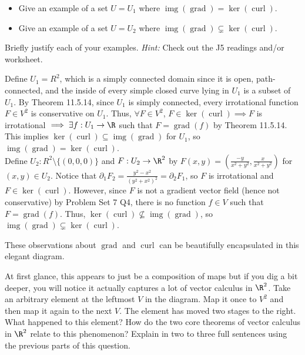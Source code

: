 \documentclass{exam}
\DeclareMathOperator{\Img}{img} %
\DeclareMathOperator{\Ker}{ker} %
\DeclareMathOperator{\Grad}{grad} %
\DeclareMathOperator{\Curl}{curl} %
\begin{document}
\begin{questions}
\begin{parts}
	\begin{itemize}
		\item Give an example of a set $U = U_1$ where $\Img(\Grad)  = \Ker(\Curl)$.
		\item Give an example of a set $U = U_2$ where $\Img(\Grad) \subsetneq \Ker(\Curl)$.
	\end{itemize}
	Briefly justify each of your examples. \textit{Hint:} Check out the J5 readings and/or worksheet.
	
	\begin{answer}{250pt}
Define $U_1=R^2$, which is a simply connected domain since it is open, path-connected, and the inside of every simple closed curve lying in $U_1$ is a subset of $U_1$. By Theorem 11.5.14, since $U_1$ is simply connected, every irrotational function $F\in V^2$ is conservative on $U_1$. Thus, $\forall F\in V^2$, $F\in \Ker(\Curl)\implies F$ is irrotational $\implies\exists f: U_1\to \R$ such that $F=\Grad(f)$ by Theorem 11.5.14. This implies $\Ker(\Curl)\subseteq\Img(\Grad)$ for $U_1$, so $\Img(\Grad) = \Ker(\Curl)$.\\

Define $U_2: R^2\setminus\{(0,0,0)\}$ and $F:U_2\to\R^2$ by $F(x,y)=(\frac{-y}{x^2+y^2},\frac{x}{x^2+y^2})$ for $(x,y)\in U_2$. Notice that $\partial_1 F_2=\frac{y^2-x^2}{(y^2+x^2)^2}=\partial_2 F_1$, so $F$ is irrotational and $F\in \Ker(\Curl)$. However, since $F$ is not a gradient vector field (hence not conservative) by Problem Set 7 Q4, there is no function $f\in V$ such that $F=\Grad(f)$. Thus, $\Ker(\Curl)\nsubseteq\Img(\Grad)$, so $\Img(\Grad) \subsetneq \Ker(\Curl)$.
	\end{answer}	
	
	\item These observations about $\Grad$ and $\Curl$   can be beautifully encapsulated in this elegant diagram. 
	\begin{center}
	\adjustbox{scale=1.5,center}{
	\begin{tikzcd}
 	 V \arrow{r}{\Grad}  & V^2 \arrow{r}{\Curl}  & V 
	\end{tikzcd}
	}
	\end{center}
	At first glance, this appears to just be a composition of maps but if you dig a bit deeper, you will notice it actually captures a lot of vector calculus in $\R^2$. 	Take an arbitrary element at the leftmost $V$ in the diagram. Map it once to $V^2$ and then map it again to the next $V$. The element has moved two stages to the right. What happened to this element? How do the two core theorems of vector calculus in $\R^2$ relate to this phenomenon? Explain in two to three full sentences using the previous parts of this question. 



\end{parts}
\end{questions}
\end{document}
